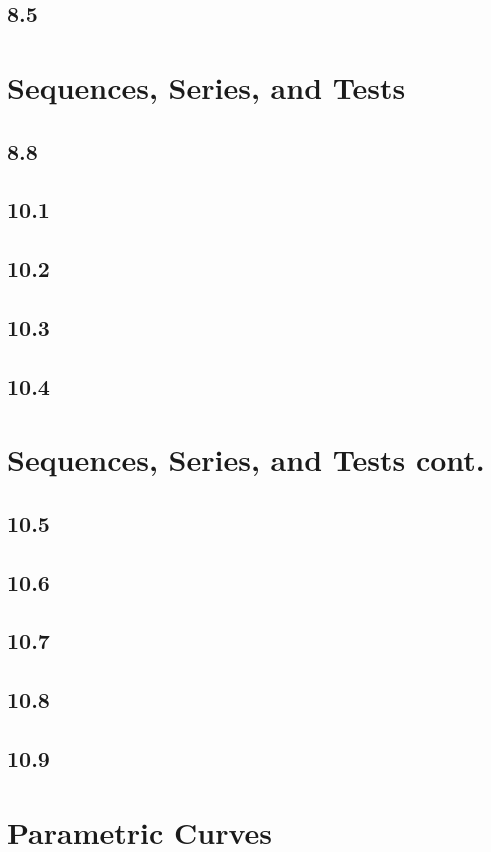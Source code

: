 \documentclass{article}
\begin{document}
        \subsection*{8.5}
    \section{Sequences, Series, and Tests}
        \subsection*{8.8}
        \subsection*{10.1}
        \subsection*{10.2}
        \subsection*{10.3}
        \subsection*{10.4}
    \section{Sequences, Series, and Tests cont.}
        \subsection*{10.5}
        \subsection*{10.6}
        \subsection*{10.7}
        \subsection*{10.8}
        \subsection*{10.9}
    \section{Parametric Curves}
\end{document}
